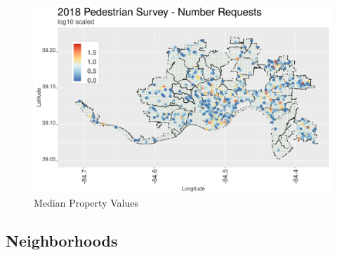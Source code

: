 \documentclass{llncs}
\begin{document}
\FloatBarrier
\begin{figure}
 	\includegraphics[width=\textwidth, height=\textheight, keepaspectratio]{pedestrianSurveyNRequests}
 	\caption{Median Property Values}
	\label{figure : pedestrianSurveyNRequests}
\end{figure}
\FloatBarrier


\subsection{Neighborhoods}
\end{document}
